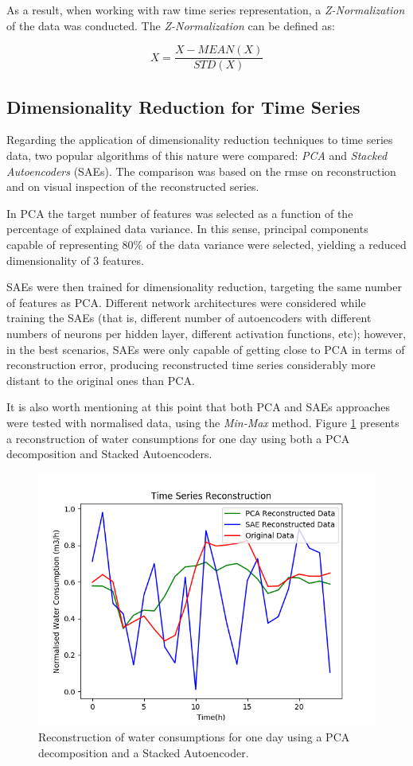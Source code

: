 \documentclass[9pt,journal,compsoc]{IEEEtran}
\begin{document}
As a result, when working with raw time series representation, a \emph{Z-Normalization} of the data was conducted. The \emph{Z-Normalization} can be defined as:

$$X = \frac{X - MEAN(X)}{STD(X)} $$

\subsection{Dimensionality Reduction for Time Series}

Regarding the application of dimensionality reduction techniques to time series data, two popular algorithms of this nature were compared: \emph{PCA} and \emph{Stacked Autoencoders} (SAEs). The comparison was based on the rmse on reconstruction and on visual inspection of the reconstructed series.

In PCA the target number of features was selected as a function of the percentage of explained data variance. In this sense, principal components capable of representing $80\%$ of the data variance were selected, yielding a reduced dimensionality of 3 features.

SAEs were then trained for dimensionality reduction, targeting the same number of features as PCA. Different network architectures were considered while training the SAEs (that is, different number of autoencoders with different numbers of neurons per hidden layer, different activation functions, etc); however, in the best scenarios, SAEs were only capable of getting close to PCA in terms of reconstruction error, producing reconstructed time series considerably more distant to the original ones than PCA.

It is also worth mentioning at this point that both PCA and SAEs approaches were tested with normalised data, using the \emph{Min-Max} method. Figure \ref{day3_reconstruction} presents a reconstruction of water consumptions for one day using both a PCA decomposition and Stacked Autoencoders.

\begin{figure}[ht]
	\centering
	\includegraphics[scale=0.5]{images/pca_sae_day3.png}
	\caption{Reconstruction of water consumptions for one day using a PCA decomposition and a Stacked Autoencoder.}
	\label{day3_reconstruction}
\end{figure}
\end{document}
